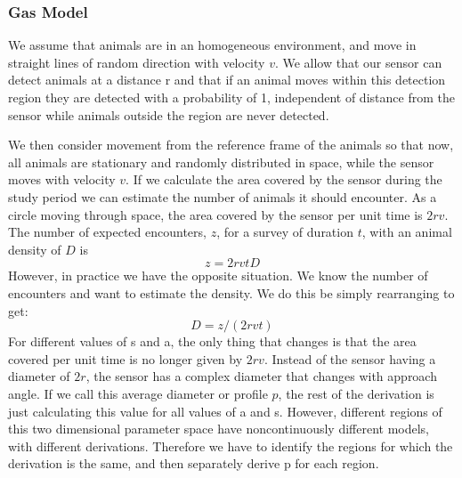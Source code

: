\documentclass[a4paper,10pt,reqno,oneside]{amsart}
\begin{document}
\subsubsection{Gas Model}

We assume that animals are in an homogeneous environment, and move in straight lines of random direction with velocity $v$. We allow that our sensor can detect animals at a distance r and that if an animal moves within this detection region they are detected with a probability of 1, independent of distance from the sensor while animals outside the region are never detected.

We then consider movement from the reference frame of the animals so that now, all animals are stationary and randomly distributed in space, while the sensor moves with velocity $v$. If we calculate the area covered by the sensor during the study period we can estimate the number of animals it should encounter. As a circle moving through space, the area covered by the sensor per unit time is $2rv$. The number of expected encounters, $z$, for a survey of duration $t$, with an animal density of $D$ is
\begin{equation}
	z = 2rvtD
\end{equation}
However, in practice we have the opposite situation. We know the number of encounters and want to estimate the density. We do this be simply rearranging to get:
\begin{equation}
	D = z/(2rvt)
\end{equation}
For different values of s and a, the only thing that changes is that the area covered per unit time is no longer given by $2rv$. Instead of the sensor having a diameter of $2r$, the sensor has a complex diameter that changes with approach angle. If we call this average diameter or profile $p$, the rest of the derivation is just calculating this value for all values of a and s. However, different regions of this two dimensional parameter space have noncontinuously different models, with different derivations. Therefore we have to identify the regions for which the derivation is the same, and then separately derive p for each region.
\end{document}
